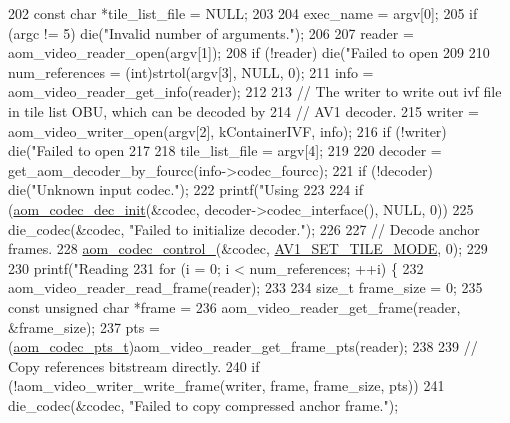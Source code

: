 \begin{DoxyCodeInclude}
{202   \textcolor{keyword}{const} \textcolor{keywordtype}{char} *tile\_list\_file = NULL;
203 
204   exec\_name = argv[0];
205   \textcolor{keywordflow}{if} (argc != 5) die(\textcolor{stringliteral}{"Invalid number of arguments."});
206 
207   reader = aom\_video\_reader\_open(argv[1]);
208   \textcolor{keywordflow}{if} (!reader) die(\textcolor{stringliteral}{"Failed to open %
209 
210   num\_references = (int)strtol(argv[3], NULL, 0);
211   info = aom\_video\_reader\_get\_info(reader);
212 
213   \textcolor{comment}{// The writer to write out ivf file in tile list OBU, which can be decoded by}
214   \textcolor{comment}{// AV1 decoder.}
215   writer = aom\_video\_writer\_open(argv[2], kContainerIVF, info);
216   \textcolor{keywordflow}{if} (!writer) die(\textcolor{stringliteral}{"Failed to open %
217 
218   tile\_list\_file = argv[4];
219 
220   decoder = get\_aom\_decoder\_by\_fourcc(info->codec\_fourcc);
221   \textcolor{keywordflow}{if} (!decoder) die(\textcolor{stringliteral}{"Unknown input codec."});
222   printf(\textcolor{stringliteral}{"Using %
223 
224   \textcolor{keywordflow}{if} (\hyperlink{group__decoder_gafdbfca65b19ab1f6d72b32cd01753b9b}{aom\_codec\_dec\_init}(&codec, decoder->codec\_interface(), NULL, 0))
225     die\_codec(&codec, \textcolor{stringliteral}{"Failed to initialize decoder."});
226 
227   \textcolor{comment}{// Decode anchor frames.}
228   \hyperlink{group__codec_ga51eb332a40dcacc39000ab8e0be36b79}{aom\_codec\_control\_}(&codec, \hyperlink{group__aom__decoder_gga3865fd4b3192489baa9a5c3632ebe97ba0795d8084ae8c78528c01587198df9e2}{AV1\_SET\_TILE\_MODE}, 0);
229 
230   printf(\textcolor{stringliteral}{"Reading %
231   \textcolor{keywordflow}{for} (i = 0; i < num\_references; ++i) \{
232     aom\_video\_reader\_read\_frame(reader);
233 
234     \textcolor{keywordtype}{size\_t} frame\_size = 0;
235     \textcolor{keyword}{const} \textcolor{keywordtype}{unsigned} \textcolor{keywordtype}{char} *frame =
236         aom\_video\_reader\_get\_frame(reader, &frame\_size);
237     pts = (\hyperlink{group__encoder_ga958524226c9a65251c9e4f7bb78fc606}{aom\_codec\_pts\_t})aom\_video\_reader\_get\_frame\_pts(reader);
238 
239     \textcolor{comment}{// Copy references bitstream directly.}
240     \textcolor{keywordflow}{if} (!aom\_video\_writer\_write\_frame(writer, frame, frame\_size, pts))
241       die\_codec(&codec, \textcolor{stringliteral}{"Failed to copy compressed anchor frame."});
}}}}}
\end{DoxyCodeInclude}
